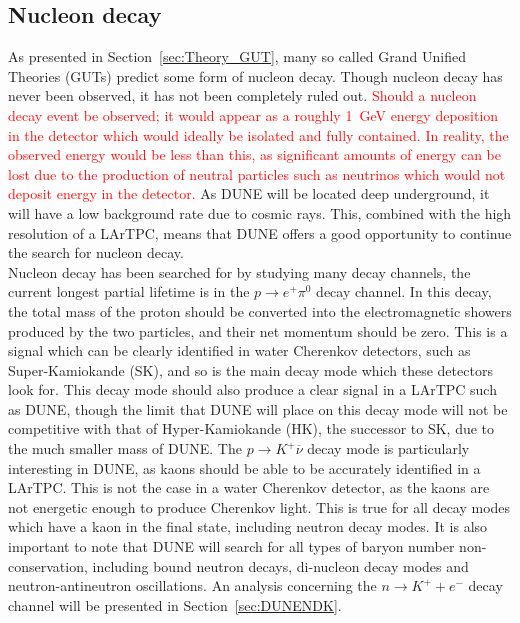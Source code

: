 \subsection{Nucleon decay} \label{sec:DUNE_NDK}%
As presented in Section~\ref{sec:Theory_GUT}, many so called Grand Unified Theories (GUTs) predict some form of nucleon decay. Though nucleon decay has never been observed, it has not been completely ruled out. \textcolor{red}{Should a nucleon decay event be observed; it would appear as a roughly 1~GeV energy deposition in the detector which would ideally be isolated and fully contained. In reality, the observed energy would be less than this, as significant amounts of energy can be lost due to the production of neutral particles such as neutrinos which would not deposit energy in the detector.} As DUNE will be located deep underground, it will have a low background rate due to cosmic rays. This, combined with the high resolution of a LArTPC, means that DUNE offers a good opportunity to continue the search for nucleon decay. \\

Nucleon decay has been searched for by studying many decay channels, the current longest partial lifetime is in the $p \rightarrow e^{+} \pi^{0}$ decay channel. In this decay, the total mass of the proton should be converted into the electromagnetic showers produced by the two particles, and their net momentum should be zero. This is a signal which can be clearly identified in water Cherenkov detectors, such as Super-Kamiokande (SK), and so is the main decay mode which these detectors look for. This decay mode should also produce a clear signal in a LArTPC such as DUNE, though the limit that DUNE will place on this decay mode will not be competitive with that of Hyper-Kamiokande (HK), the successor to SK, due to the much smaller mass of DUNE. The $p \rightarrow K^{+} \overline{\nu}$ decay mode is particularly interesting in DUNE, as kaons should be able to be accurately identified in a LArTPC. This is not the case in a water Cherenkov detector, as the kaons are not energetic enough to produce Cherenkov light. This is true for all decay modes which have a kaon in the final state, including neutron decay modes. It is also important to note that DUNE will search for all types of baryon number non-conservation, including bound neutron decays, di-nucleon decay modes and neutron-antineutron oscillations. An analysis concerning the $n \rightarrow K^{+} + e^{-}$ decay channel will be presented in Section~\ref{sec:DUNENDK}. \\

